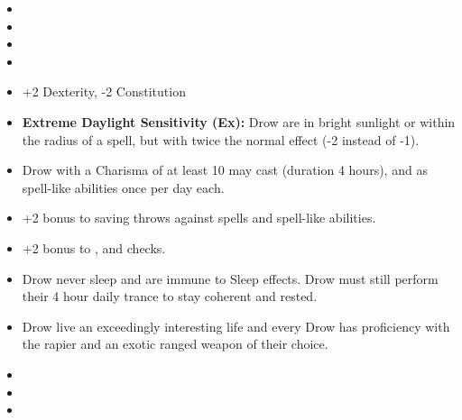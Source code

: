 \begin{itemize}
\item {}
\item {}
\item {}
\item {}
\item +2 Dexterity, -2 Constitution
\item \textbf{Extreme Daylight Sensitivity (Ex):} Drow are  in bright sunlight or within the radius of a  spell, but with twice the normal effect (-2 instead of -1).
\item Drow with a Charisma of at least 10 may cast  (duration 4 hours), and  as spell-like abilities once per day each.
\item +2 bonus to saving throws against spells and spell-like abilities.
\item +2 bonus to , and  checks.
\item Drow never sleep and are immune to Sleep effects. Drow must still perform their 4 hour daily trance to stay coherent and rested.
\item Drow live an exceedingly interesting life and every Drow has proficiency with the rapier and an exotic ranged weapon of their choice.
\item {}
\item {}
\item {}
\end{itemize}
